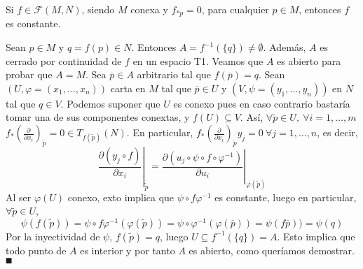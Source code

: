 \documentclass[cursovd_portada.tex]{subfiles}
\begin{document}
\begin{prop} Si $f\in\mathcal{F}(M,N)$, siendo $M$ conexa y $f_{*p}=0$, para cual\-quier $p\in M$, entonces $f$
es constante.
\end{prop}
\begin{dem}
Sean $p\in M$ y $q=f(p)\in N$. Entonces $A=f^{-1}(\{q\})\neq\emptyset$. Además, $A$ es cerrado por continuidad de $f$ en un espacio T1. Veamos que $A$ es abierto para probar que $A=M$. Sea $\overline{p}\in A$ arbitrario tal que $f(\overline{p})=q$. Sean $(U,\varphi=(x_1,\dots,x_n))$ carta en $M$ tal que $\overline{p}\in U$ y $(V,\psi=(y_1,\dots,y_n))$ en $N$ tal que $q\in V$. Podemos suponer que $U$ es conexo pues en caso contrario bastaría tomar una de sus componentes conextas, y $f(U)\subseteq V$. Así, $\forall \tilde{p}\in U,\ \forall i=1,\dots, m$ $f_*\left(\frac{\partial}{\partial x_i}\right)_{\tilde{p}}=0\in T_{f(\tilde{p})}(N)$. En particular, $f_*\left(\frac{\partial}{\partial x_i}\right)_{\tilde{p}}y_j=0\ \forall j=1,\dots, n$, es decir, 
$$\left.\frac{\partial(y_j\circ f)}{\partial x_i}\right|_{\tilde{p}}=\left.\frac{\partial(u_j\circ\psi\circ f\circ\varphi^{-1})}{\partial u_i}\right|_{\varphi(\tilde{p})}$$
Al ser $\varphi(U)$ conexo, exto implica que $\psi\circ f\varphi^{-1}$ es constante, luego en particular, $\forall \tilde{p}\in U$, 
$$\psi(f(\tilde{p}))=\psi\circ f\varphi^{-1}(\varphi(\tilde{p}))=\psi\circ\varphi^{-1}(\varphi(\overline{p}))=\psi(f\overline{p}))=\psi(q)$$
Por la inyectividad de $\psi$, $f(\tilde{p})=q$, luego $U\subseteq f^{-1}(\{q\})=A$. Esto implica que todo punto de $A$ es interior y por tanto $A$ es abierto, como queríamos demostrar. $\QED$
\end{dem}
\end{document}
